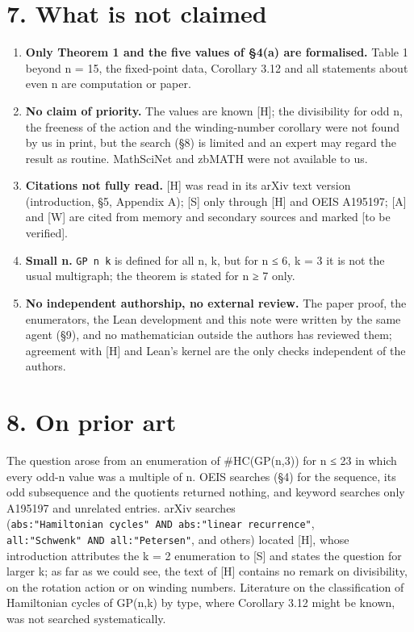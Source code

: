 \documentclass[11pt,a4paper]{article}
\theoremstyle{named}
\begin{document}
\section*{7. What is not claimed}
\begin{enumerate}
\item[1.] \textbf{Only Theorem 1 and the five values of §4(a) are formalised.} Table 1 beyond n = 15, the fixed-point data, Corollary 3.12 and all statements about even n are computation or paper.
\item[2.] \textbf{No claim of priority.} The values are known [H]; the divisibility for odd n, the freeness of the action and the winding-number corollary were not found by us in print, but the search (§8) is limited and an expert may regard the result as routine. MathSciNet and zbMATH were not available to us.
\item[3.] \textbf{Citations not fully read.} [H] was read in its arXiv text version (introduction, §5, Appendix A); [S] only through [H] and OEIS A195197; [A] and [W] are cited from memory and secondary sources and marked [to be verified].
\item[4.] \textbf{Small n.} \texttt{GP\ \allowbreak{}n\ \allowbreak{}k} is defined for all n, k, but for n ≤ 6, k = 3 it is not the usual multigraph; the theorem is stated for n ≥ 7 only.
\item[5.] \textbf{No independent authorship, no external review.} The paper proof, the enumerators, the Lean development and this note were written by the same agent (§9), and no mathematician outside the authors has reviewed them; agreement with [H] and Lean's kernel are the only checks independent of the authors.
\end{enumerate}

\section*{8. On prior art}
The question arose from an enumeration of \#HC(GP(n,3)) for n ≤ 23 in which every odd-n value was a multiple of n. OEIS searches (§4) for the sequence, its odd subsequence and the quotients returned nothing, and keyword searches only A195197 and unrelated entries. arXiv searches (\texttt{abs:"Hamiltonian\ \allowbreak{}cycles"\ \allowbreak{}AND\ \allowbreak{}abs:"linear\ \allowbreak{}recurrence"}, \texttt{all:"Schwenk"\ \allowbreak{}AND\ \allowbreak{}all:"Petersen"}, and others) located [H], whose introduction attributes the k = 2 enumeration to [S] and states the question for larger k; as far as we could see, the text of [H] contains no remark on divisibility, on the rotation action or on winding numbers. Literature on the classification of Hamiltonian cycles of GP(n,k) by type, where Corollary 3.12 might be known, was not searched systematically.
\end{document}
